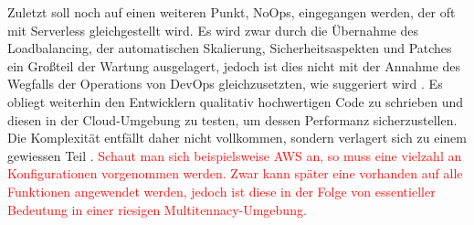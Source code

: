 \documentclass[11pt]{article}
\begin{document}
Zuletzt soll noch auf einen weiteren Punkt, \glqq NoOps\grqq{}, eingegangen werden, der oft mit Serverless gleichgestellt wird. Es wird zwar durch die Übernahme des Loadbalancing, der automatischen Skalierung, Sicherheitsaspekten und Patches ein Großteil der Wartung ausgelagert, jedoch ist dies nicht mit der Annahme des Wegfalls der Operations von DevOps gleichzusetzten, wie suggeriert wird \cite{fowler2018serverless}. Es obliegt weiterhin den Entwicklern qualitativ hochwertigen Code zu schrieben und diesen in der Cloud-Umgebung zu testen, um dessen Performanz sicherzustellen. Die Komplexität entfällt daher nicht vollkommen, sondern verlagert sich zu einem gewiessen Teil \cite{eivy2017wary}. \textcolor{red}{Schaut man sich beispielsweise AWS an, so muss eine vielzahl an Konfigurationen vorgenommen werden. Zwar kann später eine vorhanden auf alle Funktionen angewendet werden, jedoch ist diese in der Folge von essentieller Bedeutung in einer riesigen \glqq Multitennacy\grqq{}-Umgebung.}\\\\%
\end{document}
